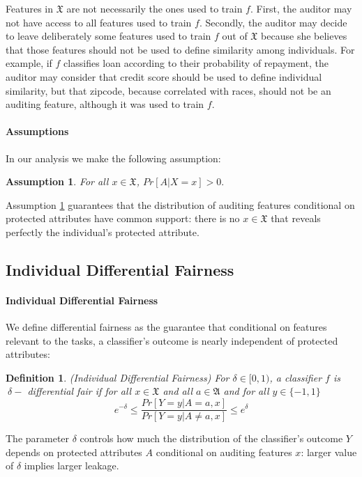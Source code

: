 \documentclass{article}
\newtheorem{assumption}{Assumption}
\newtheorem{defn}{Definition}[section]
\begin{document}
\bigskip
Features in $\mathfrak{X}$ are not necessarily the ones used to train $f$. First, the auditor may not have access to all features used to train $f$. Secondly, the auditor may decide to leave deliberately some features used to train $f$ out of $\mathfrak{X}$ because she believes that those features should not be used to define similarity among individuals. For example, if $f$ classifies loan according to their probability of repayment, the auditor may consider that credit score should be used to define individual similarity, but that zipcode, because correlated with races, should not be an auditing feature, although it was used to train $f$.  

\paragraph{Assumptions}
In our analysis we make the following assumption:
\begin{assumption}
\label{ass: 1}
For all $x\in \mathfrak{X}$, $Pr[A|X=x] > 0.$
\end{assumption}
Assumption \ref{ass: 1} guarantees that the distribution of auditing features conditional on protected attributes have common support: there is no $x\in \mathfrak{X}$ that reveals perfectly the individual's protected attribute.  

\subsection{Individual Differential Fairness}
\paragraph{Individual Differential Fairness} 
We define differential fairness as the guarantee that conditional on features relevant to the tasks, a classifier's outcome is nearly independent of protected attributes: 

\begin{defn}(Individual Differential Fairness)
\label{def: idf}
For $\delta \in [0, 1)$, a classifier $f$ is $\ \delta-$ differential fair if for all $x\in\mathfrak{X}$ and all $a\in \mathfrak{A}$ and for all $y\in\{-1, 1\}$
\begin{equation}
\label{eq: idf}
   e^{-\delta} \leq \frac{Pr[Y=y|A =a, x]}{Pr[Y=y|A\neq a, x]} \leq e^{\delta}
\end{equation}
\end{defn}

The parameter $\delta$ controls how much the distribution of the classifier's outcome $Y$ depends on protected attributes $A$ conditional on auditing features $x$: larger value of $\delta$ implies larger leakage. 
\end{document}
